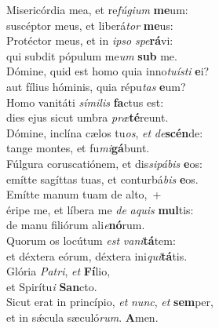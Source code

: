\evenverse Misericórdia mea, et re\textit{fú}\textit{gi}\textit{um} \textbf{me}um:~\*\\
\evenverse suscéptor meus, et liberá\textit{tor} \textbf{me}us:\\
\oddverse Protéctor meus, et in \textit{i}\textit{pso} \textit{spe}\textbf{rá}vi:~\*\\
\oddverse qui subdit pópulum me\textit{um} \textbf{sub} me.\\
\evenverse Dómine, quid est homo quia inno\textit{tu}\textit{í}\textit{sti} \textbf{e}i?~\*\\
\evenverse aut fílius hóminis, quia répu\textit{tas} \textbf{e}um?\\
\oddverse Homo vanitáti \textit{sí}\textit{mi}\textit{lis} \textbf{fa}ctus est:~\*\\
\oddverse dies ejus sicut umbra \textit{præ}\textbf{té}reunt.\\
\evenverse Dómine, inclína cælos tu\textit{os}, \textit{et} \textit{de}\textbf{scén}de:~\*\\
\evenverse tange montes, et fu\textit{mi}\textbf{gá}bunt.\\
\oddverse Fúlgura coruscatiónem, et dis\textit{si}\textit{pá}\textit{bis} \textbf{e}os:~\*\\
\oddverse emítte sagíttas tuas, et conturbá\textit{bis} \textbf{e}os.\\
\evenverse Emítte manum tuam de alto,~+\\
\evenverse  éripe me, et líbera me \textit{de} \textit{a}\textit{quis} \textbf{mul}tis:~\*\\
\evenverse de manu filiórum ali\textit{e}\textbf{nó}rum.\\
\oddverse Quorum os locútum \textit{est} \textit{va}\textit{ni}\textbf{tá}tem:~\*\\
\oddverse et déxtera eórum, déxtera ini\textit{qui}\textbf{tá}tis.\\
\evenverse Glória \textit{Pa}\textit{tri}, \textit{et} \textbf{Fí}lio,~\*\\
\evenverse et Spirítu\textit{i} \textbf{San}cto.\\
\oddverse Sicut erat in princípio, \textit{et} \textit{nunc}, \textit{et} \textbf{sem}per,~\*\\
\oddverse et in sǽcula sæculó\textit{rum}. \textbf{A}men.\\
